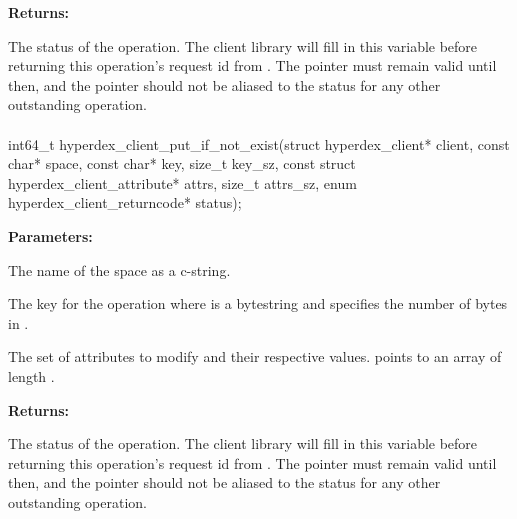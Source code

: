 \noindent\textbf{Returns:}
\begin{description}[labelindent=\widthof{{\code{status}}},leftmargin=*,noitemsep,nolistsep,align=right]
\item[\code{status}] The status of the operation.  The client library will fill in this variable before returning this operation's request id from .  The pointer must remain valid until then, and the pointer should not be aliased to the status for any other outstanding operation.
\end{description}

\paragraph{}
\begin{ccode}
int64_t hyperdex_client_put_if_not_exist(struct hyperdex_client* client,
                const char* space,
                const char* key, size_t key_sz,
                const struct hyperdex_client_attribute* attrs, size_t attrs_sz,
                enum hyperdex_client_returncode* status);
\end{ccode}
\funcdesc 

\noindent\textbf{Parameters:}
\begin{description}[labelindent=\widthof{{\code{attrs}, \code{attrs\_sz}}},leftmargin=*,noitemsep,nolistsep,align=right]
\item[\code{space}] The name of the space as a c-string.
\item[\code{key}, \code{key\_sz}] The key for the operation where  is a bytestring and  specifies the number of bytes in .
\item[\code{attrs}, \code{attrs\_sz}] The set of attributes to modify and their respective values.   points to an array of length .
\end{description}

\noindent\textbf{Returns:}
\begin{description}[labelindent=\widthof{{\code{status}}},leftmargin=*,noitemsep,nolistsep,align=right]
\item[\code{status}] The status of the operation.  The client library will fill in this variable before returning this operation's request id from .  The pointer must remain valid until then, and the pointer should not be aliased to the status for any other outstanding operation.
\end{description}

